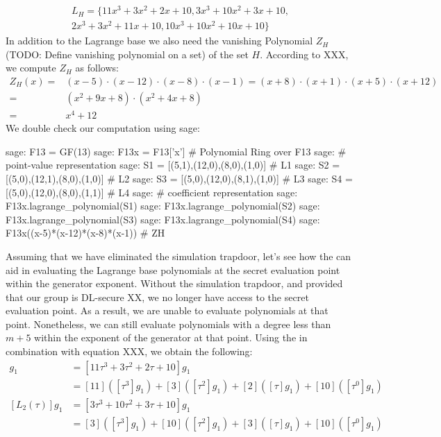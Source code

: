 \begin{example}
\begin{multline}
\label{ex:lagrange-base-H}
L_H = \{ 11x^3 +3x^2 +2x + 10, 3x^3 +10x^2+ 3x + 10, \\ 2x^3 + 3x^2 +11x +10, 10x^3 + 10 x^2 +10x + 10\}
\end{multline}
In addition to the Lagrange base we also need the vanishing Polynomial $Z_H$ (TODO: Define vanishing polynomial on a set) of the set $H$. According to XXX, we compute $Z_H$ as follows:
\begin{align*}
Z_H(x) = & (x-5)\cdot(x-12)\cdot(x-8)\cdot(x-1) = (x+8)\cdot(x+1)\cdot(x+5)\cdot(x+12) \\
       = & (x^2 + 9x +8) \cdot (x^2 + 4x +8)\\
       = & x^4 +12
\end{align*}
We double check our computation using sage:
\begin{sagecommandline}
sage: F13 = GF(13)
sage: F13x = F13['x'] # Polynomial Ring over F13
sage: # point-value representation
sage: S1 = [(5,1),(12,0),(8,0),(1,0)] # L1
sage: S2 = [(5,0),(12,1),(8,0),(1,0)] # L2
sage: S3 = [(5,0),(12,0),(8,1),(1,0)] # L3
sage: S4 = [(5,0),(12,0),(8,0),(1,1)] # L4
sage: # coefficient representation
sage: F13x.lagrange_polynomial(S1)
sage: F13x.lagrange_polynomial(S2)
sage: F13x.lagrange_polynomial(S3)
sage: F13x.lagrange_polynomial(S4)
sage: F13x((x-5)*(x-12)*(x-8)*(x-1)) # ZH
\end{sagecommandline} 
Assuming that we have eliminated the simulation trapdoor, let's see how the  can aid in evaluating the Lagrange base polynomials at the secret evaluation point within the generator exponent. Without the simulation trapdoor, and provided that our group is DL-secure XX, we no longer have access to the secret evaluation point. As a result, we are unable to evaluate polynomials at that point. Nonetheless, we can still evaluate polynomials with a degree less than $m+5$ within the exponent of the generator at that point. Using the  in combination with equation XXX, we obtain the following:
\begin{align*}
[L_1(\tau)]g_1 & = [11\tau^3 +3\tau^2 +2\tau + 10] g_1 \\
               & = [11]([\tau^3]g_1) +[3]([\tau^2]g_1) +[2]([\tau]g_1) + [10]([\tau^0] g_1) \\
[L_2(\tau)]g_1 & = [3\tau^3 +10\tau^2+ 3\tau + 10] g_1 \\
               & = [3]([\tau^3]g_1) + [10]([\tau^2]g_1) + [3]([\tau]g_1) + [10]([\tau^0]g_1) \\

\end{align*}
\end{example}
